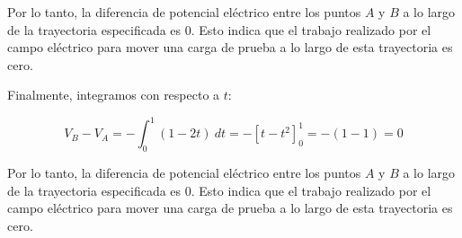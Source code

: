 \documentclass{article}
\begin{document}
Por lo tanto, la diferencia de potencial eléctrico entre los puntos $A$ y $B$ a lo largo de la trayectoria especificada es 0. Esto indica que el trabajo realizado por el campo eléctrico para mover una carga de prueba a lo largo de esta trayectoria es cero.

\begin{center}
\end{center}


Finalmente, integramos con respecto a $t$:

\[
V_B - V_A = -\int_0^1 (1 - 2t) \ dt = -[t - t^2]_0^1 = -(1 - 1) = 0
\]

Por lo tanto, la diferencia de potencial eléctrico entre los puntos $A$ y $B$ a lo largo de la trayectoria especificada es 0. Esto indica que el trabajo realizado por el campo eléctrico para mover una carga de prueba a lo largo de esta trayectoria es cero.
\end{document}
